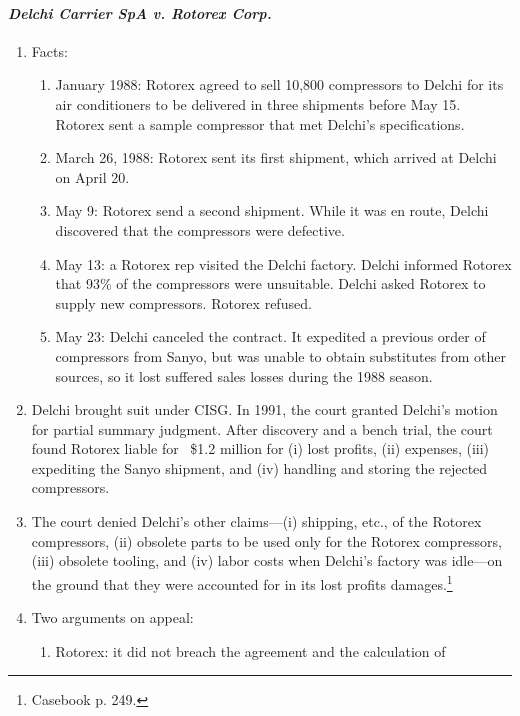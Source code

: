 \paragraph{\emph{Delchi Carrier SpA v. Rotorex Corp.}}
\begin{enumerate}
    \item Facts:
    \begin{enumerate}
        \item January 1988: Rotorex agreed to sell 10,800 compressors to 
        Delchi for its air conditioners to be delivered in three shipments 
        before May 15. Rotorex sent a sample compressor that met Delchi's 
        specifications.
        \item March 26, 1988: Rotorex sent its first shipment, which arrived 
        at Delchi on April 20.
        \item May 9: Rotorex send a second shipment. While it was en route, 
        Delchi discovered that the compressors were defective.
        \item May 13: a Rotorex rep visited the Delchi factory. Delchi 
        informed Rotorex that 93\% of the compressors were unsuitable. Delchi 
        asked Rotorex to supply new compressors. Rotorex refused.
        \item May 23: Delchi canceled the contract. It expedited a previous 
        order of compressors from Sanyo, but was unable to obtain substitutes 
        from other sources, so it lost suffered sales losses during the 1988 
        season. 
    \end{enumerate}
    \item Delchi brought suit under CISG. In 1991, the court granted Delchi's 
    motion for partial summary judgment. After discovery and a bench trial, 
    the court found Rotorex liable for ~\$1.2 million for (i) lost profits, 
    (ii) expenses, (iii) expediting the Sanyo shipment, and (iv) handling and 
    storing the rejected compressors.
    \item The court denied Delchi's other claims---(i) shipping, etc., 
    of the Rotorex compressors, (ii) obsolete parts to be used only for the 
    Rotorex compressors, (iii) obsolete tooling, and (iv) labor costs when 
    Delchi's factory was idle---on the ground that they were accounted for 
    in its lost profits damages.\footnote{Casebook p. 249.}
    \item Two arguments on appeal:
    \begin{enumerate}
        \item Rotorex: it did not breach the agreement and the calculation of 

\end{enumerate}
\end{enumerate}
